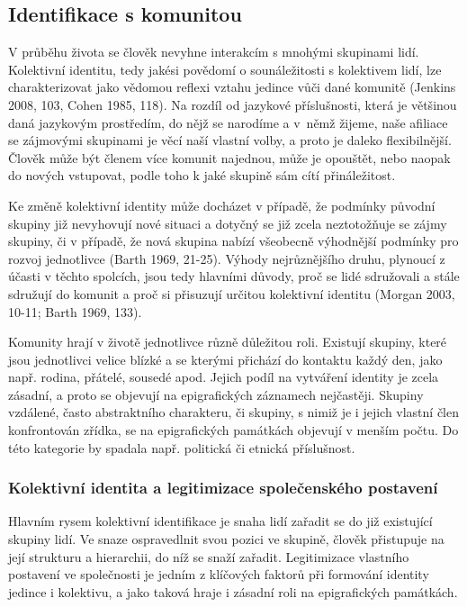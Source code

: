 \subsection[identifikace-s-komunitou]{Identifikace s komunitou}

V průběhu života se člověk nevyhne interakcím s mnohými skupinami lidí. Kolektivní identitu, tedy jakési povědomí o sounáležitosti s kolektivem lidí, lze charakterizovat jako vědomou reflexi vztahu jedince vůči dané komunitě (Jenkins 2008, 103, Cohen 1985, 118). Na rozdíl od jazykové příslušnosti, která je většinou daná jazykovým prostředím, do nějž se narodíme a v~němž žijeme, naše afiliace se zájmovými skupinami je věcí naší vlastní volby, a proto je daleko flexibilnější. Člověk může být členem více komunit najednou, může je opouštět, nebo naopak do nových vstupovat, podle toho k jaké skupině sám cítí přináležitost.

Ke změně kolektivní identity může docházet v případě, že podmínky původní skupiny již nevyhovují nové situaci a dotyčný se již zcela neztotožňuje se zájmy skupiny, či v případě, že nová skupina nabízí všeobecně výhodnější podmínky pro rozvoj jednotlivce (Barth 1969, 21-25). Výhody nejrůznějšího druhu, plynoucí z účasti v těchto spolcích, jsou tedy hlavními důvody, proč se lidé sdružovali a stále sdružují do komunit a proč si přisuzují určitou kolektivní identitu (Morgan 2003, 10-11; Barth 1969, 133).

Komunity hrají v životě jednotlivce různě důležitou roli. Existují skupiny, které jsou jednotlivci velice blízké a se kterými přichází do kontaktu každý den, jako např. rodina, přátelé, sousedé apod. Jejich podíl na vytváření identity je zcela zásadní, a proto se objevují na epigrafických záznamech nejčastěji. Skupiny vzdálené, často abstraktního charakteru, či skupiny, s nimiž je i jejich vlastní člen konfrontován zřídka, se na epigrafických památkách objevují v menším počtu. Do této kategorie by spadala např. politická či etnická příslušnost.

\subsubsection[kolektivní-identita-a-legitimizace-společenského-postavení]{Kolektivní identita a legitimizace společenského postavení}

Hlavním rysem kolektivní identifikace je snaha lidí zařadit se do již existující skupiny lidí. Ve snaze ospravedlnit svou pozici ve skupině, člověk přistupuje na její strukturu a hierarchii, do níž se snaží zařadit. Legitimizace vlastního postavení ve společnosti je jedním z klíčových faktorů při formování identity jedince i kolektivu, a jako taková hraje i zásadní roli na epigrafických památkách.

